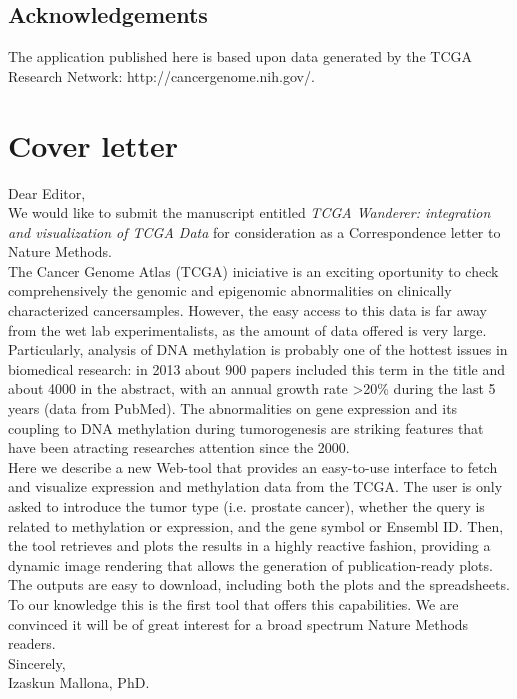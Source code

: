 \documentclass{article}
\begin{document}
\subsection{Acknowledgements}
The application published here is based upon data generated by the TCGA Research Network: http://cancergenome.nih.gov/.








\section*{Cover letter}


Dear Editor,\\

We would like to submit the manuscript entitled \textit{TCGA Wanderer: integration and visualization of TCGA Data} for consideration as a Correspondence letter to Nature Methods.\\

The Cancer Genome Atlas (TCGA) iniciative is an exciting oportunity to check comprehensively the genomic and epigenomic abnormalities on clinically characterized cancersamples. However, the easy access to this data is far away from the wet lab experimentalists, as the amount of data offered is very large.\\

Particularly, analysis of DNA methylation is probably one of the hottest issues in biomedical research: in 2013 about 900 papers included this term in the title and about 4000 in the abstract, with an annual growth rate >20\% during the last 5 years (data from PubMed). The abnormalities on gene expression and its coupling to DNA methylation during tumorogenesis are striking features that have been atracting researches attention since the 2000.\\

Here we describe a new Web-tool that provides an easy-to-use interface to fetch and visualize expression and methylation data from the TCGA. The user is only asked to introduce the tumor type (i.e. prostate cancer), whether the query is related to methylation or expression, and the gene symbol or Ensembl ID. Then, the tool retrieves and plots the results in a highly reactive fashion, providing a dynamic image rendering that allows the generation of publication-ready plots. The outputs are easy to download, including both the plots and the spreadsheets.\\

To our knowledge this is the first tool that offers this capabilities. We are convinced it will be of great interest for a broad spectrum Nature Methods readers.\\


Sincerely, \\
Izaskun Mallona, PhD.
\end{document}
